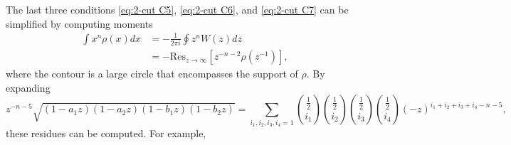 \documentclass[10pt]{article}
\newcommand{\res}{\mathrm{Res}}
\theoremstyle{plain}
\theoremstyle{definition}
\theoremstyle{plain}
\begin{document}
The last three conditions \eqref{eq:2-cut C5}, \eqref{eq:2-cut C6}, and \eqref{eq:2-cut C7} can be simplified by computing moments
\begin{align*}
 \int x^{n} \rho(x) dx &= -\frac{1}{2 \pi i}\oint z^{n} W(z)dz\\
 &=-\res_{z \rightarrow \infty}[z^{-n-2} \rho(z^{-1})],
\end{align*}
where the contour is a large circle that encompasses the support of $\rho$. By expanding 
\begin{equation*}
 z^{-n-5}\sqrt{(1-a_{1}z)(1-a_{2}z)(1-b_{1}z)(1-b_{2}z)} = \sum_{i_{1},i_{2},i_{3},i_{4}=1} {\frac{1}{2}\choose i_{1}}{\frac{1}{2}\choose i_{2}}{\frac{1}{2}\choose i_{3}}{\frac{1}{2}\choose i_{4}} (-z)^{i_{1}+i_{2}+i_{3}+i_{4} -n-5},
\end{equation*}
these residues can be computed.
For example,
\end{document}
